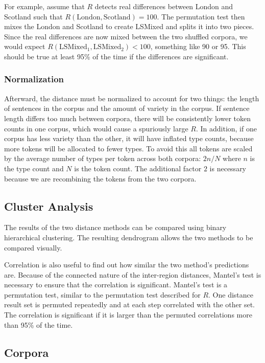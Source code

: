 \documentclass[11pt]{article}
\begin{document}
For example, assume that $R$ detects real differences between London
and Scotland such that $R(\textrm{London},\textrm{Scotland}) =
100$. The permutation test then mixes the London and Scotland to
create LSMixed and splits it into two pieces. Since the real
differences are now mixed between the two shuffled corpora, we
would expect $R(\textrm{LSMixed}_1, \textrm{LSMixed}_2) < 100$, something
like 90 or 95. This should be true at least 95\% of the time if the
differences are significant.

\subsubsection{Normalization}
Afterward, the distance must be normalized to account for two things:
the length of sentences in the corpus and the amount of variety in the
corpus. If sentence length differs too much between corpora, there
will be consistently lower token counts in one corpus, which would
cause a spuriously large $R$. In addition, if one corpus has less
variety than the other, it will have inflated type counts, because
more tokens will be allocated to fewer types. To avoid
this all tokens are scaled by the average number of types per token
across both corpora: $2n/N$ where $n$ is the type count and $N$ is
the token count. The additional factor $2$ is necessary because we are
recombining the tokens from the two corpora.

\subsection{Cluster Analysis}

The results of the two distance methods can be compared using
binary hierarchical clustering. The resulting dendrogram allows the two
methods to be compared visually.

Correlation is also useful to find out how similar the two method's
predictions are. Because of the connected nature of the inter-region
distances, Mantel's test is necessary to ensure that the correlation
is significant. Mantel's test is a permutation test, similar to the
permutation test described for $R$. One distance result set is
permuted repeatedly and at each step correlated with the other
set. The correlation is significant if it is larger than the permuted
correlations more than 95\% of the time.

\subsection{Corpora}
\end{document}
